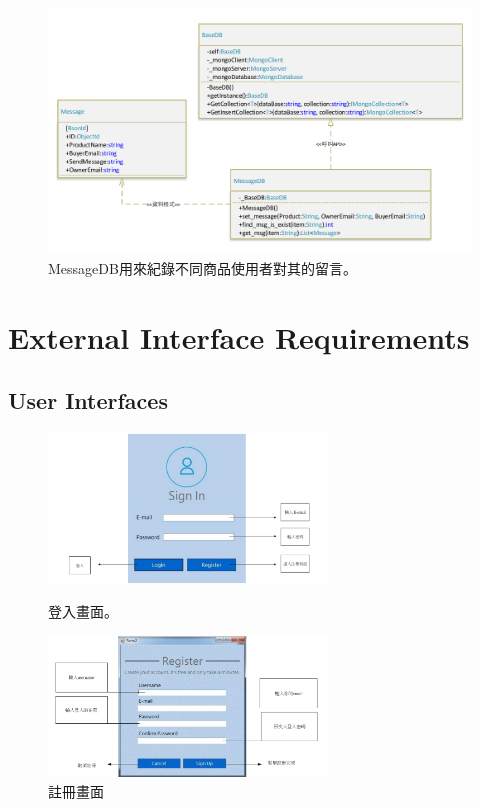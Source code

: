 \documentclass{scrreprt}
\begin{document}
\begin{CJK}{UTF8}{bkai}
\begin{figure}
	\includegraphics[width=\textwidth]{MessageDB.pdf}
	\caption{MessageDB用來紀錄不同商品使用者對其的留言。}
\end{figure}


\chapter{External Interface Requirements}

\section{User Interfaces}
\begin{figure}[h]
	\centering
	\includegraphics[width=0.66\textwidth]{signin.pdf}
	\caption{登入畫面。}
	\centering
	\includegraphics[width=0.66\textwidth]{regiter.pdf}
	\caption{註冊畫面}
\end{figure}


\end{CJK}
\end{document}
